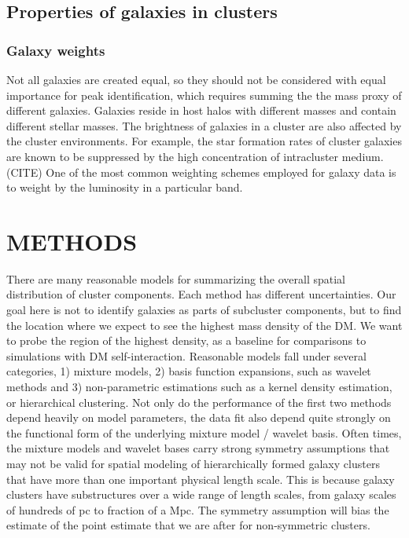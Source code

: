 \subsection{Properties of galaxies in clusters}
\subsubsection{Galaxy weights}
\label{subsubsec:galaxy_weights}
Not all galaxies are created equal, so they should not be considered with equal
importance for peak identification, which requires summing the
the mass proxy of different galaxies. Galaxies reside in host halos with different masses and 
contain different stellar masses. The brightness of galaxies in a cluster are 
also affected by the cluster environments.
For example, the star formation rates of cluster galaxies are known to be 
suppressed by the high concentration of intracluster medium. (CITE)
One of the most common weighting schemes employed for galaxy data is to weight
by the luminosity in a particular band.

\section{METHODS}\label{sec:methods}

There are many reasonable models for summarizing the overall spatial
distribution of cluster components. Each method has different uncertainties.
Our goal here is   
not to identify galaxies as parts of subcluster components,
but to find the location where we expect to see the highest mass density of the
DM. We want to probe the region of the highest density, as a baseline for
comparisons to simulations with DM self-interaction. 
Reasonable models fall under several categories, 1) mixture models, 2) basis function
expansions, such as wavelet methods \citep{Jauzac2014} and 3) non-parametric estimations 
such as a kernel density estimation, or hierarchical clustering. 
Not only do the performance of the 
first two methods depend heavily on model parameters, 
the data fit also depend quite strongly on the functional form of 
the underlying mixture model / wavelet basis. Often times, 
the mixture models and wavelet bases 
carry strong symmetry assumptions that may not be valid for spatial modeling of 
hierarchically formed galaxy clusters that have more than one important physical 
length scale. 
This is because galaxy clusters have substructures over a wide range of length
scales, from galaxy scales of hundreds of pc to fraction of a Mpc. 
The symmetry assumption will bias the estimate of the point estimate that we
are after for non-symmetric clusters.

